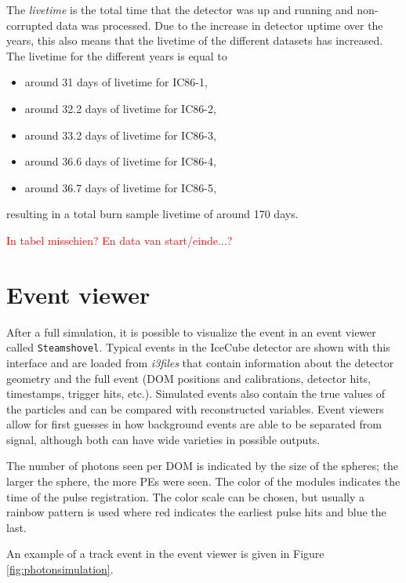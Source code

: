 \noindent The \textit{livetime} is the total time that the detector was up and running and non-corrupted data was processed. Due to the increase in detector uptime over the years, this also means that the livetime of the different datasets has increased. The livetime for the different years is equal to
\vspace{2mm}
\begin{itemize}
\item around 31 days of livetime for IC86-1,
\item around 32.2 days of livetime for IC86-2,
\item around 33.2 days of livetime for IC86-3,
\item around 36.6 days of livetime for IC86-4,
\item around 36.7 days of livetime for IC86-5,
\end{itemize}
\vspace{2mm}

\noindent resulting in a total burn sample livetime of around 170 days.

\textcolor{red}{In tabel misschien? En data van start/einde...?}

\section{Event viewer}
After a full simulation, it is possible to visualize the event in an event viewer called \texttt{Steamshovel}. Typical events in the IceCube detector are shown with this interface and are loaded from \textit{i3files} that contain information about the detector geometry and the full event (DOM positions and calibrations, detector hits, timestamps, trigger hits, etc.). Simulated events also contain the true values of the particles and can be compared with reconstructed variables. Event viewers allow for first guesses in how background events are able to be separated from signal, although both can have wide varieties in possible outputs.

The number of photons seen per DOM is indicated by the size of the spheres; the larger the sphere, the more PEs were seen. The color of the modules indicates the time of the pulse registration. The color scale can be chosen, but usually a rainbow pattern is used where red indicates the earliest pulse hits and blue the last. 

An example of a track event in the event viewer is given in Figure \ref{fig:photonsimulation}.